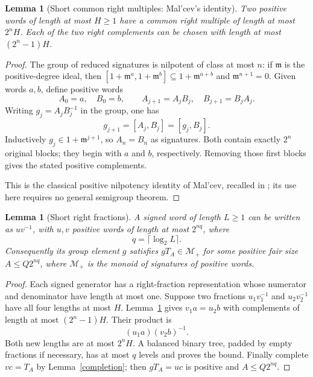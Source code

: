 \documentclass[11pt]{article}
\newtheorem{lemma}[theorem]{Lemma}
\begin{document}
\begin{lemma}[Short common right multiples: Mal'cev's identity]\label{growth}
Two positive words of length at most $H\ge1$ have a common right
multiple of length at most $2^nH$.
Each of the two right complements can be chosen with length at most
$(2^n-1)H$.
\end{lemma}
\begin{proof}
The group of reduced signatures is nilpotent of class at most $n$:
if $\mathfrak m$ is the positive-degree ideal, then
$[1+\mathfrak m^a,1+\mathfrak m^b]\subseteq1+\mathfrak m^{a+b}$ and
$\mathfrak m^{n+1}=0$.
Given words $a,b$, define positive words
\[
 A_0=a,\quad B_0=b,\qquad
 A_{j+1}=A_jB_j,\quad B_{j+1}=B_jA_j.
\]
Writing $g_j=A_jB_j^{-1}$ in the group, one has
\[
 g_{j+1}=[A_j,B_j]=[g_j,B_j].
\]
Inductively $g_j\in1+\mathfrak m^{j+1}$, so $A_n=B_n$ as
signatures. Both contain exactly $2^n$ original blocks; they begin
with $a$ and $b$, respectively. Removing those first blocks gives
the stated positive complements.

This is the classical positive nilpotency identity of Mal'cev,
recalled in \cite[\S5.1]{grigorchuk}; its use here requires no
general semigroup theorem.
\end{proof}

\begin{lemma}[Short right fractions]\label{fraction}
A signed word of length $L\ge1$ can be written as $uv^{-1}$, with
$u,v$ positive words of length at most $2^{nq}$, where
\[
 q=\lceil\log_2L\rceil.
\]
Consequently its group element $g$ satisfies $gT_A\in\mathcal M_+$
for some positive fair size $A\le Q2^{nq}$, where $\mathcal M_+$ is
the monoid of signatures of positive words.
\end{lemma}
\begin{proof}
Each signed generator has a right-fraction representation whose
numerator and denominator have length at most one. Suppose two
fractions $u_1v_1^{-1}$ and $u_2v_2^{-1}$ have all four lengths at
most $H$. Lemma~\ref{growth} gives $v_1a=u_2b$ with complements
of length at most $(2^n-1)H$. Their product is
\[
 (u_1a)(v_2b)^{-1}.
\]
Both new lengths are at most $2^nH$.
A balanced binary tree, padded by empty fractions if necessary, has
at most $q$ levels and proves the bound.
Finally complete $vc=T_A$ by Lemma~\ref{completion};
then $gT_A=uc$ is positive and $A\le Q2^{nq}$.
\end{proof}
\end{document}
